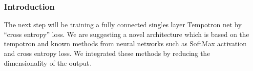 \subsubsection{Introduction}

The next step will be training a fully connected singles layer Tempotron net by “cross entropy” loss.
We are suggesting a novel architecture which is based on the tempotron and known methods from neural networks such as SoftMax activation and cross entropy loss. We integrated these methods by reducing the dimensionality of the output.

